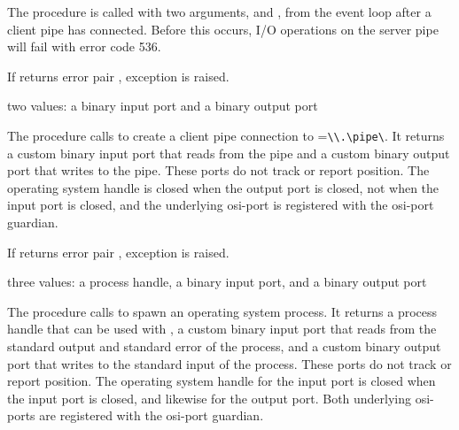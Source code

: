 The  procedure is called with two arguments, 
and , from the event loop after a client pipe has
connected. Before this occurs, I/O operations on the server pipe will
fail with error code 536.

If  returns error pair
, exception  is raised.

\begin{procedure}
\end{procedure}
\returns{} two values: a binary input port and a binary output port

The  procedure calls
 to create a client
pipe connection to =\verb|\\.\pipe\|. It
returns a custom binary input port that reads from the pipe and a
custom binary output port that writes to the pipe. These ports do not
track or report position. The operating system handle is closed when
the output port is closed, not when the input port is closed, and the
underlying osi-port is registered with the osi-port
guardian.

If  returns error pair
, exception  is raised.

\begin{procedure}
\end{procedure}
\returns{} three values: a process handle, a binary input port, and a
binary output port

The  procedure calls
to spawn an operating system process. It returns a process handle that
can be used with , a custom binary input
port that reads from the standard output and standard error of the
process, and a custom binary output port that writes to the standard
input of the process. These ports do not track or report position. The
operating system handle for the input port is closed when the input
port is closed, and likewise for the output port. Both underlying
osi-ports are registered with the osi-port guardian.

